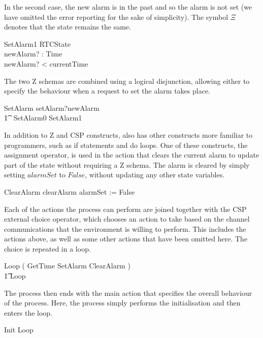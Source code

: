 \documentclass[a4paper,10pt]{report}
\begin{document}
%
In the second case, the new alarm is in the past and so the alarm is not set (we
have omitted the error reporting for the sake of simplicity). The symbol $\Xi$
denotes that the state remains the same.
%
\begin{schema}{SetAlarm1}
  \Xi RTCState \\
  newAlarm? : Time \\
\where
  newAlarm? < currentTime \\
\end{schema}
%
The two Z schemas are combined using a logical disjunction, allowing either to
specify the behaviour when a request to set the alarm takes place.
%
\begin{circusaction}
  SetAlarm \circdef setAlarm?newAlarm \\
  \t1 \then\ \lschexpract SetAlarm0 \lor SetAlarm1 \rschexpract
\end{circusaction}
%
In addition to Z and CSP constructs, \Circus{} also has other constructs more
familiar to programmers, such as if statements and do loops. One of these
constructs, the assignment operator, is used in the action that clears the
current alarm to update part of the state without requiring a Z schema.  The
alarm is cleared by simply setting $alarmSet$ to $False$, without updating any
other state variables.
%
\begin{circusaction}
  ClearAlarm \circdef clearAlarm \then alarmSet := False
\end{circusaction}
%
Each of the actions the process can perform are joined together with the CSP
external choice operator, which chooses an action to take based on the channel
communications that the environment is willing to perform. This includes the
actions above, as well as some other actions that have been omitted here. The
choice is repeated in a loop.
%
\begin{circusaction}
  Loop \circdef \left( GetTime \extchoice SetAlarm \extchoice ClearAlarm
    \extchoice \cdots \right) \\
  \t1 \circseq Loop
\end{circusaction}
%
The \Circus{} process then ends with the main action that specifies the overall
behaviour of the process. Here, the process simply performs the initialisation
and then enters the loop.
%
\begin{circusaction}
  \circspot Init \circseq Loop
\end{circusaction}
\begin{circus}
  \circend
\end{circus}
\end{document}
